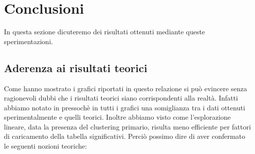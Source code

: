 \documentclass{article}
\begin{document}
\section{Conclusioni}
In questa sezione dicuteremo dei risultati ottenuti mediante queste sperimentazioni.

\subsection{Aderenza ai risultati teorici}
Come hanno mostrato i grafici riportati in questo relazione si può evincere senza ragionevoli dubbi che i risultati teorici siano corrispondenti alla realtà. Infatti abbiamo notato in pressochè in tutti i grafici una somiglianza tra i dati ottenuti sperimentalmente e quelli teorici. Inoltre abbiamo visto come l'esplorazione lineare, data la presenza del clustering primario, risulta meno efficiente per fattori di caricamento della tabella significativi. Perciò possimo dire di aver confermato le seguenti nozioni teoriche:
\end{document}
